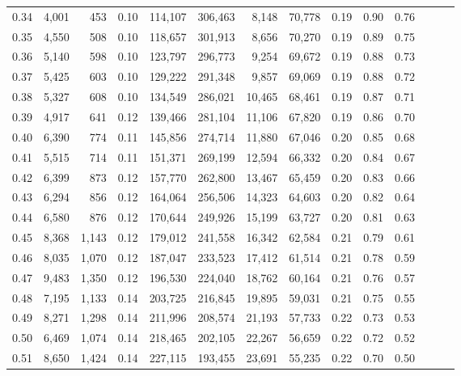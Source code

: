 \begin{tabular}{rrrrrrrrrrrrrr}
0.34 &   4,001 &    453 &  0.10 &  114,107 &  306,463 &   8,148 &  70,778 &  0.19 &  0.90 &      0.76 \\
0.35 &   4,550 &    508 &  0.10 &  118,657 &  301,913 &   8,656 &  70,270 &  0.19 &  0.89 &      0.75 \\
0.36 &   5,140 &    598 &  0.10 &  123,797 &  296,773 &   9,254 &  69,672 &  0.19 &  0.88 &      0.73 \\
0.37 &   5,425 &    603 &  0.10 &  129,222 &  291,348 &   9,857 &  69,069 &  0.19 &  0.88 &      0.72 \\
0.38 &   5,327 &    608 &  0.10 &  134,549 &  286,021 &  10,465 &  68,461 &  0.19 &  0.87 &      0.71 \\
0.39 &   4,917 &    641 &  0.12 &  139,466 &  281,104 &  11,106 &  67,820 &  0.19 &  0.86 &      0.70 \\
0.40 &   6,390 &    774 &  0.11 &  145,856 &  274,714 &  11,880 &  67,046 &  0.20 &  0.85 &      0.68 \\
0.41 &   5,515 &    714 &  0.11 &  151,371 &  269,199 &  12,594 &  66,332 &  0.20 &  0.84 &      0.67 \\
0.42 &   6,399 &    873 &  0.12 &  157,770 &  262,800 &  13,467 &  65,459 &  0.20 &  0.83 &      0.66 \\
0.43 &   6,294 &    856 &  0.12 &  164,064 &  256,506 &  14,323 &  64,603 &  0.20 &  0.82 &      0.64 \\
0.44 &   6,580 &    876 &  0.12 &  170,644 &  249,926 &  15,199 &  63,727 &  0.20 &  0.81 &      0.63 \\
0.45 &   8,368 &  1,143 &  0.12 &  179,012 &  241,558 &  16,342 &  62,584 &  0.21 &  0.79 &      0.61 \\
0.46 &   8,035 &  1,070 &  0.12 &  187,047 &  233,523 &  17,412 &  61,514 &  0.21 &  0.78 &      0.59 \\
0.47 &   9,483 &  1,350 &  0.12 &  196,530 &  224,040 &  18,762 &  60,164 &  0.21 &  0.76 &      0.57 \\
0.48 &   7,195 &  1,133 &  0.14 &  203,725 &  216,845 &  19,895 &  59,031 &  0.21 &  0.75 &      0.55 \\
0.49 &   8,271 &  1,298 &  0.14 &  211,996 &  208,574 &  21,193 &  57,733 &  0.22 &  0.73 &      0.53 \\
0.50 &   6,469 &  1,074 &  0.14 &  218,465 &  202,105 &  22,267 &  56,659 &  0.22 &  0.72 &      0.52 \\
0.51 &   8,650 &  1,424 &  0.14 &  227,115 &  193,455 &  23,691 &  55,235 &  0.22 &  0.70 &      0.50 \\

\end{tabular}
